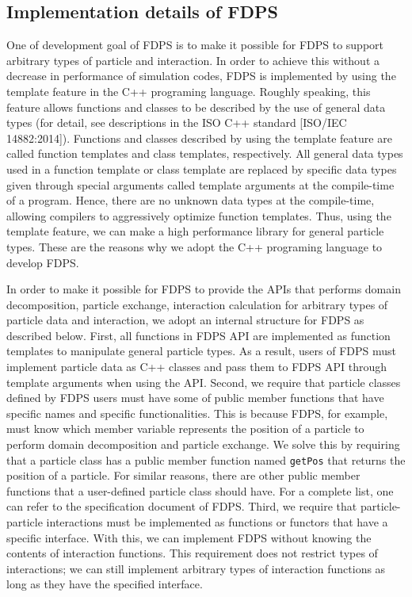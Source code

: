 \documentclass[twocolumn,useamsfonts]{pasj01}
\begin{document}
\subsection{Implementation details of FDPS}
\label{subsec:fdps_impl}
One of development goal of FDPS is to make it possible for FDPS to support arbitrary types of particle and interaction. In order to achieve this without a decrease in performance of simulation codes, FDPS is implemented by using the template feature in the C++ programing language. Roughly speaking, this feature allows functions and classes to be described by the use of general data types (for detail, see descriptions in the ISO C++ standard [ISO/IEC 14882:2014]). Functions and classes described by using the template feature are called function templates and class templates, respectively. All general data types used in a function template or class template are replaced by specific data types given through special arguments called template arguments at the compile-time of a program. Hence, there are no unknown data types at the compile-time, allowing compilers to aggressively optimize function templates. Thus, using the template feature, we can make a high performance library for general particle types. These are the reasons why we adopt the C++ programing language to develop FDPS.

In order to make it possible for FDPS to provide the APIs that performs domain decomposition, particle exchange, interaction calculation for arbitrary types of particle data and interaction, we adopt an internal structure for FDPS as described below. First, all functions in FDPS API are implemented as function templates to manipulate general particle types. As a result, users of FDPS must implement particle data as C++ classes and pass them to FDPS API through template arguments when using the API. Second, we require that particle classes defined by FDPS users must have some of public member functions that have specific names and specific functionalities. This is because FDPS, for example, must know which member variable represents the position of a particle to perform  domain decomposition and particle exchange. We solve this by requiring that a particle class has a public member function named \texttt{getPos} that returns the position of a particle. For similar reasons, there are other public member functions that a user-defined particle class should have. For a complete list, one can refer to the specification document of FDPS. Third, we require that particle-particle interactions must be implemented as functions or functors that have a specific interface. With this, we can implement FDPS without knowing the contents of interaction functions. This requirement does not restrict types of interactions; we can still implement arbitrary types of interaction functions as long as they have the specified interface.
 
\end{document}
